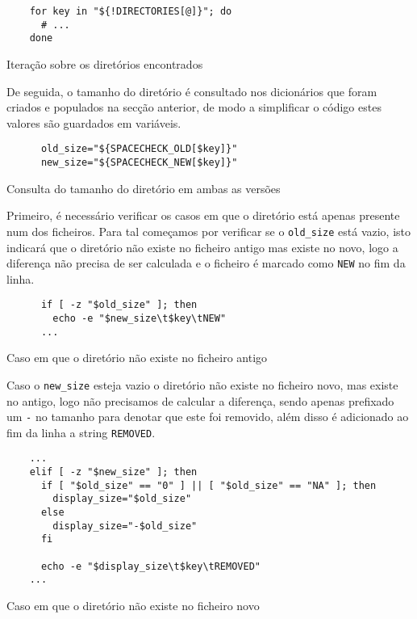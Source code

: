 \begin{listing}[H]
	\centering
	\begin{verbatim}
    for key in "${!DIRECTORIES[@]}"; do
      # ...
    done
  \end{verbatim}
	\caption{Iteração sobre os diretórios encontrados}
	\label{code:implementation_dirs_loop}
\end{listing}

De seguida, o tamanho do diretório é consultado nos dicionários que foram criados
e populados na secção anterior, de modo a simplificar o código estes valores são
guardados em variáveis.

\begin{listing}[H]
	\centering
	\begin{verbatim}
      old_size="${SPACECHECK_OLD[$key]}"
      new_size="${SPACECHECK_NEW[$key]}"
  \end{verbatim}
	\caption{Consulta do tamanho do diretório em ambas as versões}
\end{listing}

Primeiro, é necessário verificar os casos em que o diretório está apenas presente
num dos ficheiros. Para tal começamos por verificar se o \Verb|old_size| está
vazio, isto indicará que o diretório não existe no ficheiro antigo mas existe
no novo, logo a diferença não precisa de ser calculada e o ficheiro é marcado
como \Verb|NEW| no fim da linha.

\begin{listing}[H]
	\centering
	\begin{verbatim}
      if [ -z "$old_size" ]; then
        echo -e "$new_size\t$key\tNEW"
      ...
  \end{verbatim}
	\caption{Caso em que o diretório não existe no ficheiro antigo}
\end{listing}

Caso o \Verb|new_size| esteja vazio o diretório não existe no ficheiro novo,
mas existe no antigo, logo não precisamos de calcular a diferença, sendo apenas
prefixado um \Verb|-| no tamanho para denotar que este foi removido, além disso
é adicionado ao fim da linha a string \Verb|REMOVED|.

\begin{listing}[H]
	\centering
	\begin{verbatim}
    ...
    elif [ -z "$new_size" ]; then
      if [ "$old_size" == "0" ] || [ "$old_size" == "NA" ]; then
        display_size="$old_size"
      else
        display_size="-$old_size"
      fi

      echo -e "$display_size\t$key\tREMOVED"
    ...
  \end{verbatim}
	\caption{Caso em que o diretório não existe no ficheiro novo}
	\label{code:implementation_new_size_empty}
\end{listing}

